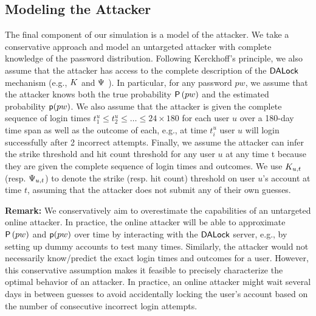 \vspace*{-\baselineskip}
\subsection{Modeling the Attacker}\label{section:ExperimentDesign-subsection:SimulateAttacker} %

The final component of our simulation is a model of the attacker. We take a conservative approach and model an untargeted attacker with complete knowledge of the password distribution. Following Kerckhoff's principle, we also assume that the attacker has access to the complete description of the $\mathsf{DALock}$ mechanism (e.g., $K$ and $\Psi$ ). In particular, for any password $pw$, we assume that the attacker knows both the true probability $ \mathsf{P}\left(pw\right)$ and the estimated probability $\textsf{p}(pw)$. We also assume that the attacker is given the complete sequence of login times $t_1^u \leq t_2^u \leq  \ldots \leq 24 \times 180$ for each user $u$ over a 180-day time span as well as the outcome of each, e.g., at time $t_i^u$ user $u$ will login successfully after 2 incorrect attempts. Finally, we assume the attacker can infer the strike threshold and hit count threshold for any user $u$ at any time t because they are given the complete sequence of login times and outcomes. We use $K_{u,t}$ (resp. $\Psi_{u,t}$) to denote the strike (resp. hit count) threshold on user $u$'s account at time $t$, assuming that the attacker does not submit any of their own guesses. 




{\bf Remark:} We conservatively aim to overestimate the capabilities of an untargeted online attacker. In practice, the online attacker will be able to approximate $ \mathsf{P}\left(pw\right)$ and $\textsf{p}(pw)$ over time by interacting with the $\mathsf{DALock}$ server, e.g., by setting up dummy accounts to test many times. Similarly, the attacker would not necessarily know/predict the exact login times and outcomes for a user. However, this conservative assumption makes it feasible to precisely characterize the optimal behavior of an attacker. In practice, an online attacker might wait several days in between guesses to avoid accidentally locking the user's account based on the number of consecutive incorrect login attempts. 




